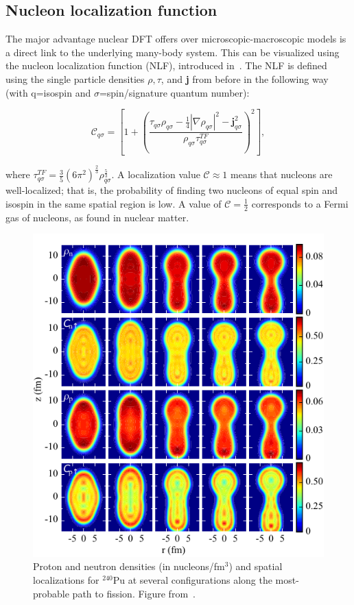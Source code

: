\subsection{Nucleon localization function}\label{sect:locali}
The major advantage nuclear DFT offers over microscopic-macroscopic models is a direct link to the underlying many-body system. This can be visualized using the nucleon localization function (NLF), introduced in~\cite{Reinhard2011,Zhang2016}. The NLF is defined using the single particle densities $\rho, \tau$, and \textbf{j} from before in the following way (with q=isospin and $\sigma$=spin/signature quantum number):

\begin{equation}
\mathcal{C}_{q\sigma} = \left[1+\left(\frac{\tau_{q\sigma}\rho_{q\sigma}-\frac{1}{4}|\nabla\rho_{q\sigma}|^2-\mathbf{j}^2_{q\sigma}}{\rho_{q\sigma}\tau_{q\sigma}^{TF}}\right)^2\right],
\end{equation}

\noindent where $\tau_{q\sigma}^{TF}=\frac{3}{5}(6\pi^2)^\frac{2}{3}\rho_{q\sigma}^\frac{5}{3}$. A localization value $\mathcal{C} \approx 1$ means that nucleons are well-localized; that is, the probability of finding two nucleons of equal spin and isospin in the same spatial region is low. A value of $\mathcal{C}=\frac{1}{2}$ corresponds to a Fermi gas of nucleons, as found in nuclear matter.

\begin{figure}
	\centering
	\includegraphics[width=0.5\linewidth]{TeX_files/methods_locali}
	\caption[Proton and neutron densities (in nucleons/fm$^3$) and spatial localizations for $^{240}$Pu at several configurations along the most-probable path to fission.]{Proton and neutron densities (in nucleons/fm$^3$) and spatial localizations for $^{240}$Pu at several configurations along the most-probable path to fission. Figure from~\cite{Zhang2016}.}
	\label{fig:methodslocali}
\end{figure}

